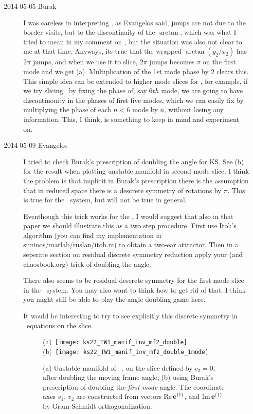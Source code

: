 \begin{description}
\item[2014-05-05 Burak]  I was careless in interpreting ,
as Evangelos said, jumps are not due to the border visits, but to the discontinuity
of the $\arctan$, which was what I tried to mean in my comment on ,
but the situation was also not clear to me at that time. Anyways, its true
that the wrapped $\arctan(y_2 / x_2)$ has $2 \pi$ jumps, and when we use
it to slice, $2 \pi$ jumps becomes $\pi$ on the first mode and we get
(a). Multiplication of the 1st mode phase by $2$
clears this. This simple idea can be extended to higher mode slices for \KS ,
for example, if we try slicing \KS\ by fixing the phase of, say $6th$ mode,
we are going to have discontinouity in the phases of first five modes, which
we can easily fix by multiplying the phase of each $n<6$ mode by $n$, without
losing any information. This, I think, is something to keep in mind and
experiment on.

\item[2014-05-09 Evangelos] I tried to check Burak's prescription of doubling the angle
for KS. See (b) for the result when plotting
 unstable manifold in second mode slice. I think the problem is that implicit in
Burak's prescription there is the assumption that in reduced space there is a descrete
symmetry of rotations by $\pi$. This is true for the \twoMode\ system, but will not be
true in general.

Eventhough this trick works for the \twoMode, I would suggest that also in that
paper we should illustrate this as a two step procedure. First use Itoh's algorithm
(you can find my implementation in siminos/matlab/ruslan/itoh.m) to obtain a two-ear
attractor. Then in a seperate section on residual discrete symmetry reduction
apply your (and chaosbook.org) trick of doubling the angle.

There also seems to be residual descrete symmetry for the first mode slice in the \twoMode\
system. You may also want to think how to get rid of that. I think you might still be
able to play the angle doubling game here.

It would be interesting to try to see explicitly this discrete symmetry in \twoMode\
equations on the slice.

\begin{figure}
\begin{center}
(a)~\texttt{[image: ks22\_TW1\_manif\_inv\_mf2\_double]}~
 (b)~\texttt{[image: ks22\_TW1\_manif\_inv\_mf2\_double\_1mode]}
\end{center}
\caption{
(a) Unstable manifold of \reqv\ , on the slice defined by $c_2=0$,
after doubling the moving frame angle,
(b) using Burak's prescription of doubling the \emph{first mode} angle.
The coordinate axes $v_1$, $v_2$ are constructed from vectors Re\,$\jEigvec[1]$,
and Im\,$\jEigvec[1]$ by Gram-Schmidt
orthogonalization.
       }
\label{f:KS22TW1_manif_mf2_double}
\end{figure}


\end{description}
